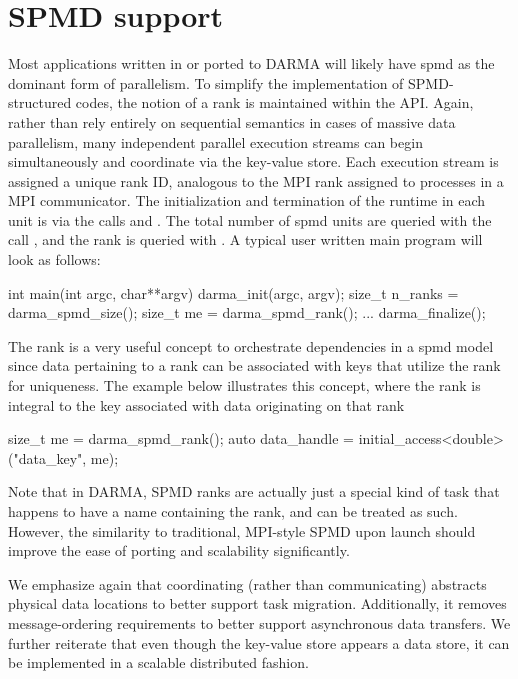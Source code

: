 
\section{SPMD support}
\label{sec:spmd}
Most applications written in or ported to DARMA will likely have \gls{spmd} as
the dominant form of parallelism.
To simplify the implementation of SPMD-structured codes, the notion of 
a \gls{rank} is maintained within the \gls{API}.   
Again, rather than rely entirely on sequential semantics in cases of massive data parallelism,
many independent parallel execution streams can begin simultaneously and coordinate via the key-value store.
Each execution stream is assigned a unique rank ID, analogous to the MPI rank assigned to processes in a MPI communicator.
The initialization and termination of the runtime in each unit 
is via the calls  and . 
The total number of \gls{spmd} units are queried with the call ,
and the rank is queried with . A typical user 
written main program will look as follows:
\begin{CppCode}
int main(int argc, char**argv){
  darma_init(argc, argv);
  size_t n_ranks = darma_spmd_size();
  size_t me = darma_spmd_rank();
  ...
  darma_finalize();
}
\end{CppCode}

The rank is a very useful concept to orchestrate dependencies in a \gls{spmd}
model since data pertaining to a rank can be associated with keys that utilize
the rank for uniqueness. The example below illustrates this concept, where
the rank is integral to the key associated with data originating on that rank
\begin{CppCode}
size_t me = darma_spmd_rank();
auto data_handle = initial_access<double>("data_key", me);
\end{CppCode}  
Note that in DARMA, SPMD ranks are actually just a special kind of task that
happens to have a name containing the rank, and can be treated as such. 
However, the similarity to traditional, MPI-style SPMD upon launch should improve the ease of porting and scalability significantly.

We emphasize again that coordinating (rather than communicating) abstracts physical data locations to better support task migration.
Additionally, it removes message-ordering requirements to better support asynchronous data transfers.
We further reiterate that even though the key-value store appears a data store,
it can be implemented in a scalable distributed fashion.

